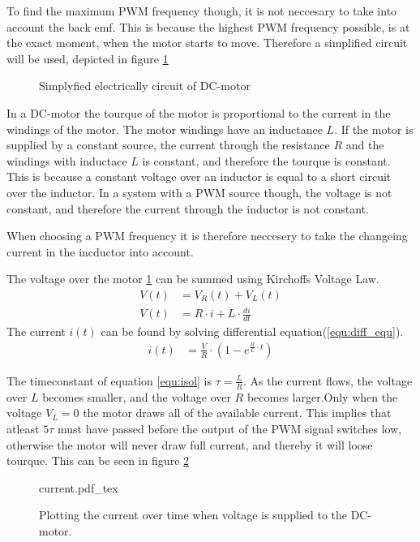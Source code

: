 \documentclass[../../Main]{subfiles}
\begin{document}
To find the maximum PWM frequency though, it is not neccesary to take into account the back emf. This is because the highest PWM frequency possible, is at the exact moment, when the motor starts to move. Therefore a simplified circuit will be used, depicted in figure \ref{fig:electrical} 

\begin{figure}[H]
	\center
	
	\caption{Simplyfied electrically circuit of DC-motor}
  \label{fig:electrical}
\end{figure}


In a DC-motor the tourque of the motor is proportional to the current in the windings of the motor. The motor windings have an inductance $L$.
If the motor is supplied by a constant source, the current through the resistance $R$ and the windings with inductace $L$ is constant, and therefore the tourque is constant. This is because a constant voltage over an inductor is equal to a short circuit over the inductor. 
In a system with a PWM source though, the voltage is not constant, and therefore the current through the inductor is not constant.

When choosing a PWM frequency it is therefore neccesery to take the changeing current in the incductor into account. 

The voltage over the motor \ref{fig:electrical} can be summed using Kirchoffs Voltage Law. 
\begin{align}
	V(t) &= V_R(t) + V_L(t)\\
	V(t) &= R \cdot i + L \cdot \frac{di}{dt}
	\label{equ:diff_equ}
\end{align}
The current $i(t)$ can be found by solving differential equation(\ref{equ:diff_equ}).   
\begin{align}
	i(t) &=\frac{V}{R} \cdot (1-e^{\frac{R}{L} \cdot t})
	\label{equ:isol}
\end{align}

The timeconstant of equation \ref{equ:isol} is $\tau = \frac{L}{R}$.
As the current flows, the voltage over $L$ becomes smaller, and the voltage over $R$ becomes larger.Only when the voltage $V_L = 0$ the motor draws all of the available current. This implies that atleast $5\tau$ must have passed before the output of the PWM signal switches low, otherwise the motor will never draw full current, and thereby it will loose tourque. This can be seen in figure \ref{fig:currentplot}

\begin{figure}[H]
\centering
\def\svgwidth{\textwidth}
{current.pdf_tex}
\caption{Plotting the current over time when voltage is supplied to the DC-motor.}
\label{fig:currentplot}
\end{figure}
\end{document}

